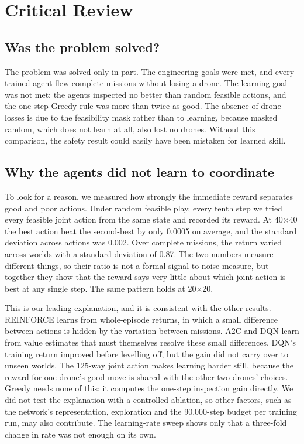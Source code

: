 \section{Critical Review}
\label{sec:review}

\subsection{Was the problem solved?}

The problem was solved only in part. The engineering goals were met, and every trained agent
flew complete missions without losing a drone. The learning goal was not met: the agents
inspected no better than random feasible actions, and the one-step Greedy rule was more than
twice as good. The absence of drone losses is due to the feasibility mask rather than to
learning, because masked random, which does not learn at all, also lost no drones. Without
this comparison, the safety result could easily have been mistaken for learned skill.

\subsection{Why the agents did not learn to coordinate}

To look for a reason, we measured how strongly the immediate reward separates good and poor
actions. Under random feasible play, every tenth step we tried every feasible joint action from
the same state and recorded its reward. At 40$\times$40 the best action beat the second-best
by only 0.0005 on average, and the standard deviation across actions was 0.002. Over complete
missions, the return varied across worlds with a standard deviation of 0.87. The two numbers
measure different things, so their ratio is not a formal signal-to-noise measure, but together
they show that the reward says very little about which joint action is best at any single
step. The same pattern holds at 20$\times$20.

This is our leading explanation, and it is consistent with the other results. REINFORCE
learns from whole-episode returns, in which a small difference between actions is hidden by
the variation between missions. A2C and DQN learn from value estimates that must themselves
resolve these small differences. DQN's training return improved before levelling off, but the
gain did not carry over to unseen worlds. The 125-way joint action makes learning harder
still, because the reward for one drone's good move is shared with the other two drones'
choices. Greedy needs none of this: it computes the one-step inspection gain directly. We did
not test the explanation with a controlled ablation, so other factors, such as the network's
representation, exploration and the 90{,}000-step budget per training run, may also
contribute. The learning-rate sweep shows only that a three-fold change in rate was not
enough on its own.

